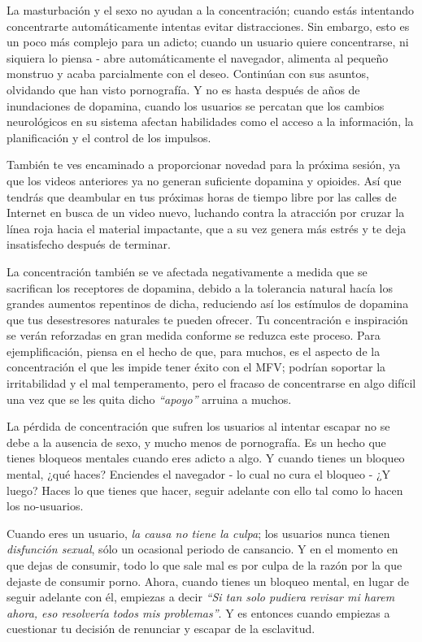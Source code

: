 \documentclass[
  spanish,
  openany]{book}
\begin{document}
La masturbación y el sexo no ayudan a la concentración; cuando estás intentando concentrarte automáticamente intentas evitar distracciones. Sin embargo, esto es un poco más complejo para un adicto; cuando un usuario quiere concentrarse, ni siquiera lo piensa - abre automáticamente el navegador, alimenta al pequeño monstruo y acaba parcialmente con el deseo. Continúan con sus asuntos, olvidando que han visto pornografía. Y no es hasta después de años de inundaciones de dopamina, cuando los usuarios se percatan que los cambios neurológicos en su sistema afectan habilidades como el acceso a la información, la planificación y el control de los impulsos.

También te ves encaminado a proporcionar novedad para la próxima sesión, ya que los videos anteriores ya no generan suficiente dopamina y opioides. Así que tendrás que deambular en tus próximas horas de tiempo libre por las calles de Internet en busca de un video nuevo, luchando contra la atracción por cruzar la línea roja hacia el material impactante, que a su vez genera más estrés y te deja insatisfecho después de terminar.

La concentración también se ve afectada negativamente a medida que se sacrifican los receptores de dopamina, debido a la tolerancia natural hacía los grandes aumentos repentinos de dicha, reduciendo así los estímulos de dopamina que tus desestresores naturales te pueden ofrecer. Tu concentración e inspiración se verán reforzadas en gran medida conforme se reduzca este proceso. Para ejemplificación, piensa en el hecho de que, para muchos, es el aspecto de la concentración el que les impide tener éxito con el MFV; podrían soportar la irritabilidad y el mal temperamento, pero el fracaso de concentrarse en algo difícil una vez que se les quita dicho \emph{``apoyo''} arruina a muchos.

La pérdida de concentración que sufren los usuarios al intentar escapar no se debe a la ausencia de sexo, y mucho menos de pornografía. Es un hecho que tienes bloqueos mentales cuando eres adicto a algo. Y cuando tienes un bloqueo mental, ¿qué haces? Enciendes el navegador - lo cual no cura el bloqueo - ¿Y luego? Haces lo que tienes que hacer, seguir adelante con ello tal como lo hacen los no-usuarios.

Cuando eres un usuario, \emph{la causa no tiene la culpa}; los usuarios nunca tienen \emph{disfunción sexual}, sólo un ocasional periodo de cansancio. Y en el momento en que dejas de consumir, todo lo que sale mal es por culpa de la razón por la que dejaste de consumir porno. Ahora, cuando tienes un bloqueo mental, en lugar de seguir adelante con él, empiezas a decir \emph{``Si tan solo pudiera revisar mi harem ahora, eso resolvería todos mis problemas''}. Y es entonces cuando empiezas a cuestionar tu decisión de renunciar y escapar de la esclavitud.
\end{document}
